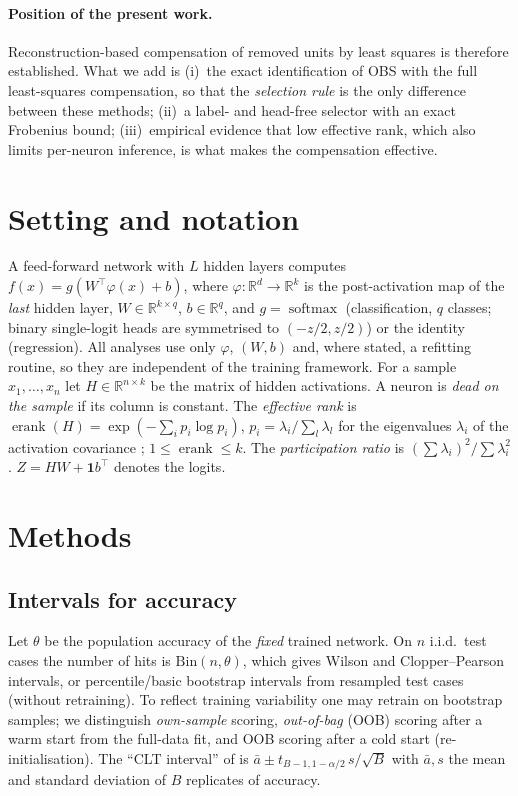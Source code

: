 \documentclass[11pt,a4paper]{article}
\theoremstyle{remark}\newtheorem{remark}{Remark}
\newcommand{\R}{\mathbb{R}}
\DeclareMathOperator{\softmax}{softmax}
\DeclareMathOperator{\erank}{erank}
\begin{document}
\paragraph{Position of the present work.} Reconstruction-based compensation of removed units by least squares is therefore established. What we add is (i)~the exact identification of OBS with the full least-squares compensation, so that the \emph{selection rule} is the only difference between these methods; (ii)~a label- and head-free selector with an exact Frobenius bound; (iii)~empirical evidence that low effective rank, which also limits per-neuron inference, is what makes the compensation effective.

\section{Setting and notation}
A feed-forward network with $L$ hidden layers computes $f(x)=g\!\left(W^\top\varphi(x)+b\right)$, where $\varphi:\R^d\to\R^k$ is the post-activation map of the \emph{last} hidden layer, $W\in\R^{k\times q}$, $b\in\R^q$, and $g=\softmax$ (classification, $q$ classes; binary single-logit heads are symmetrised to $(-z/2,z/2)$) or the identity (regression). All analyses use only $\varphi$, $(W,b)$ and, where stated, a refitting routine, so they are independent of the training framework. For a sample $x_1,\dots,x_n$ let $H\in\R^{n\times k}$ be the matrix of hidden activations. A neuron is \emph{dead on the sample} if its column is constant. The \emph{effective rank} is $\erank(H)=\exp(-\sum_i p_i\log p_i)$, $p_i=\lambda_i/\sum_l\lambda_l$ for the eigenvalues $\lambda_i$ of the activation covariance \cite{roy2007}; $1\le\erank\le k$. The \emph{participation ratio} is $(\sum\lambda_i)^2/\sum\lambda_i^2$. $Z=HW+\mathbf 1b^\top$ denotes the logits.

\section{Methods}\label{sec:methods}
\subsection{Intervals for accuracy}\label{sec:ci}
Let $\theta$ be the population accuracy of the \emph{fixed} trained network. On $n$ i.i.d.\ test cases the number of hits is $\mathrm{Bin}(n,\theta)$, which gives Wilson and Clopper--Pearson intervals, or percentile/basic bootstrap intervals from resampled test cases (without retraining). To reflect training variability one may retrain on bootstrap samples; we distinguish \emph{own-sample} scoring, \emph{out-of-bag} (OOB) scoring after a warm start from the full-data fit, and OOB scoring after a cold start (re-initialisation). The ``CLT interval'' of \cite{almohamad2024} is $\bar a\pm t_{B-1,1-\alpha/2}\,s/\sqrt B$ with $\bar a,s$ the mean and standard deviation of $B$ replicates of accuracy.
\end{document}
